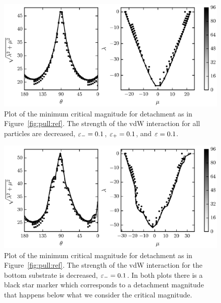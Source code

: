 	\begin{figure}[t]
		\begin{center}
			\includegraphics{./fig/ch3/pull/eb0.1_et0.1_e0.1/grid.eps}
		\end{center}		
		\caption{Plot of the minimum critical magnitude for detachment as in Figure~\ref{fig:pull:ref}. The strength of the vdW interaction for all particles are decreased, $\varepsilon_-=0.1$, $\varepsilon_+=0.1$, and $\varepsilon=0.1$.
		\label{fig:pull:eb0.1_et0.1_e0.1}}
	\end{figure}

	\begin{figure}[t]
		\begin{center}
			\includegraphics{./fig/ch3/pull/eb0.1/grid.eps}
		\end{center}		
		\caption{Plot of the minimum critical magnitude for detachment as in Figure~\ref{fig:pull:ref}. The strength of the vdW interaction for the bottom substrate is decreased, $\varepsilon_-=0.1$. In both plots there is a black star marker which corresponds to a detachment magnitude that happens below what we consider the critical magnitude.
		\label{fig:pull:eb0.1}}
	\end{figure}


